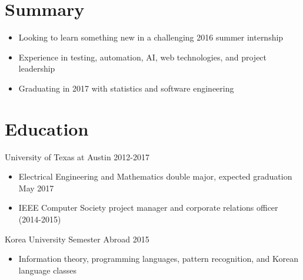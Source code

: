 \documentclass[line,margin]{res}
\begin{document}
    \address{10336 Kilmarnock Drive, Austin, TX 78726}
    \address{(512) 917-8236 |
    \href{mailto:jdong42@gmail.com}{jdong42@gmail.com}}

\begin{resume}

\vspace{-8pt}
\section{Summary}
    \vspace{22pt}
        \begin{itemize} \itemsep -2pt
        \item Looking to learn something new in a challenging 2016 summer internship
        \item Experience in testing, automation, AI, web technologies, and project leadership 
        \item Graduating in 2017 with statistics and software engineering
        \end{itemize}

   
\vspace{-8pt}
\section{Education} 
    \vspace{12pt}
    University of Texas at Austin \hfill 2012-2017 \\
    \vspace{-12pt}
        \begin{itemize} \itemsep -2pt
        \item Electrical Engineering and Mathematics double major, expected graduation May 2017
        \item IEEE Computer Society project manager and corporate relations officer (2014-2015)
        \end{itemize}
     
    \vspace{-6pt}
    Korea University Semester Abroad \hfill 2015 \\
    \vspace{-12pt}
        \begin{itemize} \itemsep -2pt
        \item Information theory, programming languages, pattern recognition, and Korean language classes
        \end{itemize}
  


\end{resume}
\end{document}
